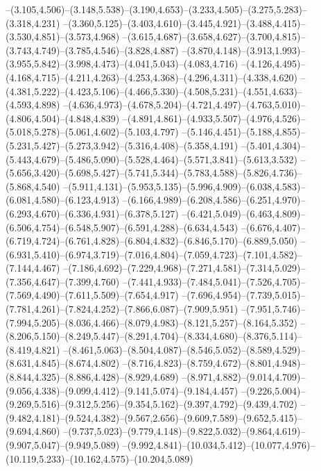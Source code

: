   --(3.105,4.506)--(3.148,5.538)--(3.190,4.653)--(3.233,4.505)--(3.275,5.283)--(3.318,4.231)%
  --(3.360,5.125)--(3.403,4.610)--(3.445,4.921)--(3.488,4.415)--(3.530,4.851)--(3.573,4.968)%
  --(3.615,4.687)--(3.658,4.627)--(3.700,4.815)--(3.743,4.749)--(3.785,4.546)--(3.828,4.887)%
  --(3.870,4.148)--(3.913,1.993)--(3.955,5.842)--(3.998,4.473)--(4.041,5.043)--(4.083,4.716)%
  --(4.126,4.495)--(4.168,4.715)--(4.211,4.263)--(4.253,4.368)--(4.296,4.311)--(4.338,4.620)%
  --(4.381,5.222)--(4.423,5.106)--(4.466,5.330)--(4.508,5.231)--(4.551,4.633)--(4.593,4.898)%
  --(4.636,4.973)--(4.678,5.204)--(4.721,4.497)--(4.763,5.010)--(4.806,4.504)--(4.848,4.839)%
  --(4.891,4.861)--(4.933,5.507)--(4.976,4.526)--(5.018,5.278)--(5.061,4.602)--(5.103,4.797)%
  --(5.146,4.451)--(5.188,4.855)--(5.231,5.427)--(5.273,3.942)--(5.316,4.408)--(5.358,4.191)%
  --(5.401,4.304)--(5.443,4.679)--(5.486,5.090)--(5.528,4.464)--(5.571,3.841)--(5.613,3.532)%
  --(5.656,3.420)--(5.698,5.427)--(5.741,5.344)--(5.783,4.588)--(5.826,4.736)--(5.868,4.540)%
  --(5.911,4.131)--(5.953,5.135)--(5.996,4.909)--(6.038,4.583)--(6.081,4.580)--(6.123,4.913)%
  --(6.166,4.989)--(6.208,4.586)--(6.251,4.970)--(6.293,4.670)--(6.336,4.931)--(6.378,5.127)%
  --(6.421,5.049)--(6.463,4.809)--(6.506,4.754)--(6.548,5.907)--(6.591,4.288)--(6.634,4.543)%
  --(6.676,4.407)--(6.719,4.724)--(6.761,4.828)--(6.804,4.832)--(6.846,5.170)--(6.889,5.050)%
  --(6.931,5.410)--(6.974,3.719)--(7.016,4.804)--(7.059,4.723)--(7.101,4.582)--(7.144,4.467)%
  --(7.186,4.692)--(7.229,4.968)--(7.271,4.581)--(7.314,5.029)--(7.356,4.647)--(7.399,4.760)%
  --(7.441,4.933)--(7.484,5.041)--(7.526,4.705)--(7.569,4.490)--(7.611,5.509)--(7.654,4.917)%
  --(7.696,4.954)--(7.739,5.015)--(7.781,4.261)--(7.824,4.252)--(7.866,6.087)--(7.909,5.951)%
  --(7.951,5.746)--(7.994,5.205)--(8.036,4.466)--(8.079,4.983)--(8.121,5.257)--(8.164,5.352)%
  --(8.206,5.150)--(8.249,5.447)--(8.291,4.704)--(8.334,4.680)--(8.376,5.114)--(8.419,4.821)%
  --(8.461,5.063)--(8.504,4.087)--(8.546,5.052)--(8.589,4.529)--(8.631,4.845)--(8.674,4.802)%
  --(8.716,4.823)--(8.759,4.672)--(8.801,4.948)--(8.844,4.325)--(8.886,4.428)--(8.929,4.689)%
  --(8.971,4.882)--(9.014,4.709)--(9.056,4.338)--(9.099,4.412)--(9.141,5.074)--(9.184,4.457)%
  --(9.226,5.004)--(9.269,5.516)--(9.312,5.256)--(9.354,5.162)--(9.397,4.792)--(9.439,4.702)%
  --(9.482,4.181)--(9.524,4.382)--(9.567,2.656)--(9.609,7.589)--(9.652,5.415)--(9.694,4.860)%
  --(9.737,5.023)--(9.779,4.148)--(9.822,5.032)--(9.864,4.619)--(9.907,5.047)--(9.949,5.089)%
  --(9.992,4.841)--(10.034,5.412)--(10.077,4.976)--(10.119,5.233)--(10.162,4.575)--(10.204,5.089)%
